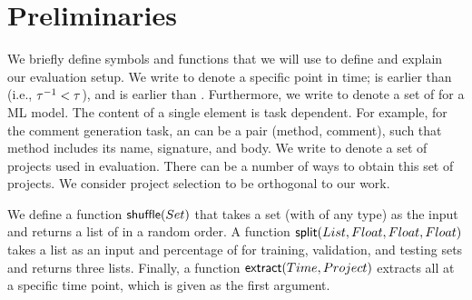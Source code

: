 \section{Preliminaries}
\label{sec:prelim}

We briefly define symbols and functions that we will use to define
\methodologies and explain our evaluation setup.  We write \atime{} to
denote a specific point in time; \atimep{} is earlier than \atime{}
(i.e., $\tau^{-1} < \tau$), and \atimepp{} is earlier than \atimep{}.
Furthermore, we write \aexamples{} to denote a set of \examples for a ML model.  The
content of a single element is task dependent.  For example, for the
comment generation task, an \example can be a pair (method, comment),
such that method includes its name, signature, and body.  We write
\aprojects{} to denote a set of projects used in evaluation.  There
can be a number of ways to obtain this set of projects.  We consider
project selection to be orthogonal to our work.

We define a function $\mathsf{shuffle}(Set)$ that takes a set (with \examples
of any type) as the input and returns a list of \examples in a random
order.  A function $\mathsf{split}(List, Float, Float, Float)$ takes a list as an
input and percentage of \examples for training, validation, and testing
sets and returns three lists. 
Finally, a function $\mathsf{extract}(Time,
Project)$ extracts all \examples {} at a specific time point, which is
given as the first argument.
